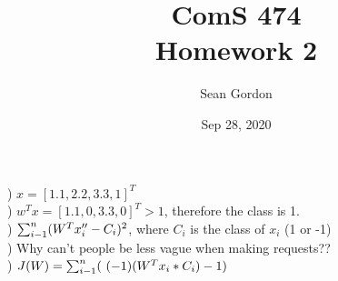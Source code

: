 \documentclass[12pt]{article}
\title{ComS 474\\Homework 2}
\author{Sean Gordon}
\date{Sep 28, 2020}
\begin{document}
\maketitle



) $x = [1.1, 2.2, 3.3, 1]^T$\\


) $w^Tx = [1.1, 0, 3.3, 0]^T > 1$, therefore the class is 1.\\


) ${\large \sum_{i-1}^{n}}(W^Tx_i'' - C_i)^2$, where $C_i$ is the class of $x_i$ (1 or -1)\\


) Why can't people be less vague when making requests??\\


)  $J(W) = {\large \sum_{i-1}^{n}}(\ (-1)(W^Tx_i*C_i) - 1)$\\

\end{document}
